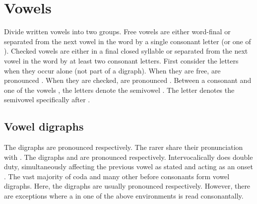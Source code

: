 \section{Vowels}\label{sec:orth-vowels}
Divide written vowels into two groups. Free vowels are either word-final or separated from the next vowel in the word by a single consonant letter (or one of ).
Checked vowels are either in a final closed syllable or separated from the next vowel in the word by at least two consonant letters.
First consider the letters  when they occur alone (not part of a digraph). When they are free,  are pronounced .
When they are checked,  are pronounced .
Between a consonant and one of the vowels , the letters  denote the semivowel . The letter  denotes the semivowel  specifically after .

\subsection{Vowel digraphs}
The digraphs  are pronounced  respectively. The rarer  share their pronunciation with .
The digraphs  and  are pronounced  respectively. Intervocalically  does double duty, simultaneously affecting the previous vowel as stated and acting as an onset .
The vast majority of coda  and many other  before consonants form vowel digraphs. Here, the digraphs  are usually pronounced  respectively.
However, there are exceptions where a  in one of the above environments is read consonantally.
